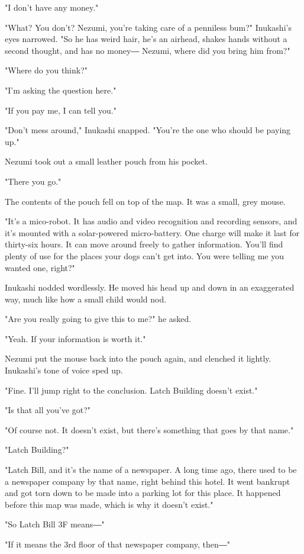"I don't have any money."

"What? You don't? Nezumi, you're taking care of a penniless bum?"
Inukashi's eyes narrowed. "So he has weird hair, he's an airhead, shakes
hands without a second thought, and has no money― Nezumi, where did you
bring him from?"

"Where do you think?"

"I'm asking the question here."

"If you pay me, I can tell you."

"Don't mess around," Inukashi snapped. "You're the one who should be
paying up."

Nezumi took out a small leather pouch from his pocket.

"There you go."

The contents of the pouch fell on top of the map. It was a small, grey
mouse.

"It's a mico-robot. It has audio and video recognition and recording
sensors, and it's mounted with a solar-powered micro-battery. One charge
will make it last for thirty-six hours. It can move around freely to
gather information. You'll find plenty of use for the places your dogs
can't get into. You were telling me you wanted one, right?"

Inukashi nodded wordlessly. He moved his head up and down in an
exaggerated way, much like how a small child would nod.

"Are you really going to give this to me?" he asked.

"Yeah. If your information is worth it."

Nezumi put the mouse back into the pouch again, and clenched it lightly.
Inukashi's tone of voice sped up.

"Fine. I'll jump right to the conclusion. Latch Building doesn't exist."

"Is that all you've got?"

"Of course not. It doesn't exist, but there's something that goes by
that name."

"Latch Building?"

"Latch Bill, and it's the name of a newspaper. A long time ago, there
used to be a newspaper company by that name, right behind this hotel. It
went bankrupt and got torn down to be made into a parking lot for this
place. It happened before this map was made, which is why it doesn't
exist."

"So Latch Bill 3F means―"

"If it means the 3rd floor of that newspaper company, then―"

